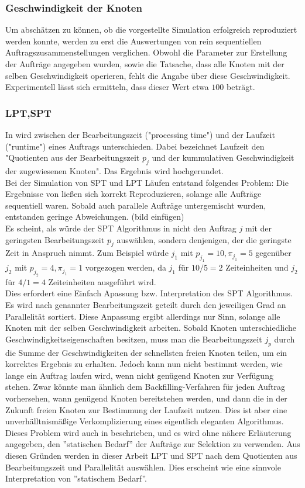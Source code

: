 \subsubsection{Geschwindigkeit der Knoten}
Um abschätzen zu können, ob die vorgestellte Simulation erfolgreich reproduziert werden konnte, werden zu erst die Auswertungen von rein sequentiellen Auftragszusammenstellungen verglichen. Obwohl die Parameter zur Erstellung der Aufträge angegeben wurden, sowie die Tatsache, dass alle Knoten mit der selben Geschwindigkeit operieren, fehlt die Angabe über diese Geschwindigkeit. Experimentell lässt sich ermitteln, dass dieser Wert etwa $100$ beträgt.

\subsubsection{LPT,SPT}
\label{spt-lpt-time}
In \cite{Arn99} wird zwischen der Bearbeitungszeit ("processing time") und der Laufzeit ("runtime") eines Auftrags unterschieden. Dabei bezeichnet Laufzeit den "Quotienten aus der Bearbeitungszeit $p_j$ und der kummulativen Geschwindigkeit der zugewiesenen Knoten". Das Ergebnis wird hochgerundet.\\
Bei der Simulation von SPT und LPT Läufen entstand folgendes Problem: Die Ergebnisse von \cite{Arn99} ließen sich korrekt Reproduzieren, solange alle Aufträge sequentiell waren. Sobald auch parallele Aufträge untergemischt wurden, entstanden geringe Abweichungen. (bild einfügen)\\
Es scheint, als würde der SPT Algorithmus in \cite{Arn99} nicht den Auftrag $j$ mit der geringsten Bearbeitungszeit $p_j$ auswählen, sondern denjenigen, der die geringste Zeit in Anspruch nimmt. Zum Beispiel würde $j_1$ mit $p_{j_1} = 10, \pi_{j_1} = 5$ gegenüber $j_2$ mit $p_{j_2} = 4, \pi_{j_1} = 1$ vorgezogen werden, da $j_1$ für $10/5 = 2$  Zeiteinheiten und $j_2$ für $4/1 = 4$ Zeiteinheiten ausgeführt wird.\\
Dies erfordert eine Einfach Apassung bzw. Interpretation des SPT Algorithmus. Es wird nach genannter Bearbeitungszeit geteilt durch den jeweiligen Grad an Parallelität sortiert. Diese Anpassung ergibt allerdings nur Sinn, solange alle Knoten mit der selben Geschwindigkeit arbeiten. Sobald Knoten unterschiedliche Geschwindigkeitseigenschaften besitzen, muss man die Bearbeitungszeit $j_p$ durch die Summe der Geschwindigkeiten der schnellsten freien Knoten teilen, um ein korrektes Ergebnis zu erhalten. Jedoch kann nun nicht bestimmt werden, wie lange ein Auftrag laufen wird, wenn nicht genügend Knoten zur Verfügung stehen. Zwar könnte man ähnlich dem Backfilling-Verfahren für jeden Auftrag vorhersehen, wann genügend Knoten bereitstehen werden, und dann die in der Zukunft freien Knoten zur Bestimmung der Laufzeit nutzen. Dies ist aber eine unverhälltnismäßige Verkomplizierung eines eigentlich eleganten Algorithmus.\\
Dieses Problem wird auch in \cite{Arn99} beschrieben, und es wird ohne nähere Erläuterung angegeben, den ''statischen Bedarf'' der Aufträge zur Selektion zu verwenden. Aus diesen Gründen werden in dieser Arbeit LPT und SPT nach dem Quotienten aus Bearbeitungszeit und Parallelität auswählen. Dies erscheint wie eine sinnvole Interpretation von ''statischem Bedarf''.

